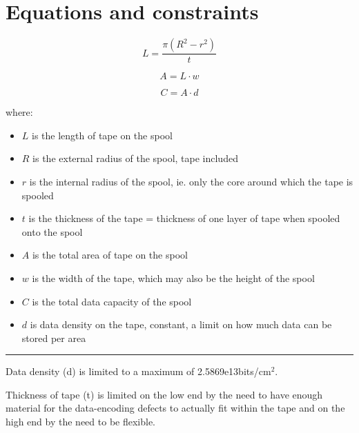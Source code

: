 \documentclass[a4paper]{article}
\begin{document}
	\vfill
	
	\tableofcontents
	
	\pagebreak
	
	\section{Equations and constraints}
	
	$$ L = \frac{\pi (R^2 - r^2)}{t} $$
	
	$$ A = L \cdot w $$
	
	$$ C = A \cdot d $$
	
	where:
	
	\begin{itemize}
		\item $L$ is the length of tape on the spool
		
		\item $R$ is the external radius of the spool, tape included
		
		\item $r$ is the internal radius of the spool, ie. only the core around which the tape is spooled
		
		\item $t$ is the thickness of the tape = thickness of one layer of tape when spooled onto the spool
		
		\item $A$ is the total area of tape on the spool
		
		\item $w$ is the width of the tape, which may also be the height of the spool
		
		\item $C$ is the total data capacity of the spool
		
		\item $d$ is data density on the tape, constant, a limit on how much data can be stored per area
	\end{itemize}
	
	\medskip
	
	\noindent \rule{\linewidth}{1pt}
	
	\medskip
	
	Data density (d) is limited to a maximum of 2.5869e13bits/cm$^2$.
	
	\bigskip
	
	Thickness of tape (t) is limited on the low end by the need to have enough material for the data-encoding defects to actually fit within the tape and on the high end by the need to be flexible.
	
\end{document}
